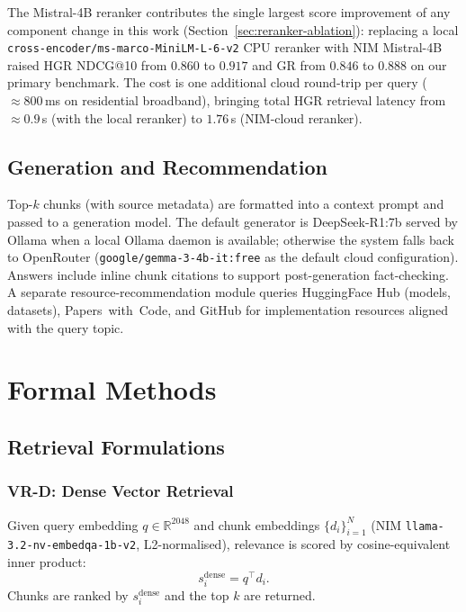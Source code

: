 \documentclass[journal]{IEEEtran}
\begin{document}
The Mistral-4B reranker contributes the single largest score
improvement of any component change in this work
(Section~\ref{sec:reranker-ablation}): replacing a local
\texttt{cross-encoder/ms-marco-MiniLM-L-6-v2} CPU reranker with NIM
Mistral-4B raised HGR NDCG@10 from $0.860$ to $0.917$ and GR from
$0.846$ to $0.888$ on our primary benchmark. The cost is one
additional cloud round-trip per query ($\approx 800$\,ms on
residential broadband), bringing total HGR retrieval latency from
$\approx 0.9$\,s (with the local reranker) to $1.76$\,s
(NIM-cloud reranker).

\subsection{Generation and Recommendation}
Top-$k$ chunks (with source metadata) are formatted into a context
prompt and passed to a generation model. The default generator is
DeepSeek-R1:7b served by Ollama when a local Ollama daemon is
available; otherwise the system falls back to OpenRouter
(\texttt{google/gemma-3-4b-it:free} as the default cloud
configuration). Answers include inline chunk citations to support
post-generation fact-checking. A separate resource-recommendation
module queries HuggingFace Hub (models, datasets), Papers~with~Code,
and GitHub for implementation resources aligned with the query topic.

\section{Formal Methods}
\label{sec:methods}

\subsection{Retrieval Formulations}

\subsubsection*{VR-D: Dense Vector Retrieval}
Given query embedding $q \in \mathbb{R}^{2048}$ and chunk embeddings
$\{d_i\}_{i=1}^{N}$ (NIM \texttt{llama-3.2-nv-embedqa-1b-v2},
L2-normalised), relevance is scored by cosine-equivalent inner
product:
\begin{equation}
  s_i^{\mathrm{dense}} = q^\top d_i.
  \label{eq:dense}
\end{equation}
Chunks are ranked by $s_i^{\mathrm{dense}}$ and the top $k$ are
returned.
\end{document}
